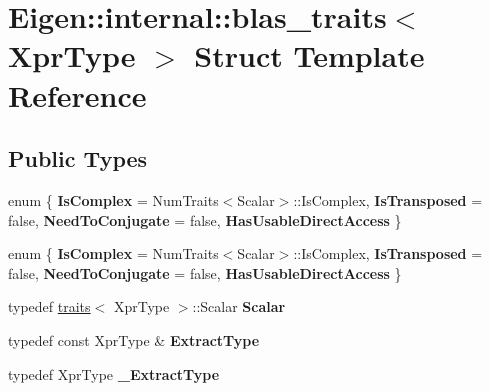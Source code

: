 \hypertarget{struct_eigen_1_1internal_1_1blas__traits}{}\section{Eigen\+:\+:internal\+:\+:blas\+\_\+traits$<$ Xpr\+Type $>$ Struct Template Reference}
\label{struct_eigen_1_1internal_1_1blas__traits}
\subsection*{Public Types}
\begin{DoxyCompactItemize}
\item 
\mbox{\label{struct_eigen_1_1internal_1_1blas__traits_aa182e1521086cb597f3a8b97972f165c}} 
enum \{ {\bfseries Is\+Complex} = Num\+Traits$<$Scalar$>$\+:\+:Is\+Complex, 
{\bfseries Is\+Transposed} = false, 
{\bfseries Need\+To\+Conjugate} = false, 
{\bfseries Has\+Usable\+Direct\+Access}
 \}
\item 
\mbox{\label{struct_eigen_1_1internal_1_1blas__traits_aeee0d46b5f37957c002753e973af4cbe}} 
enum \{ {\bfseries Is\+Complex} = Num\+Traits$<$Scalar$>$\+:\+:Is\+Complex, 
{\bfseries Is\+Transposed} = false, 
{\bfseries Need\+To\+Conjugate} = false, 
{\bfseries Has\+Usable\+Direct\+Access}
 \}
\item 
\mbox{\label{struct_eigen_1_1internal_1_1blas__traits_ac5b1b5ec7dfe61418c561674e47a5cdd}} 
typedef \hyperlink{struct_eigen_1_1internal_1_1traits}{traits}$<$ Xpr\+Type $>$\+::Scalar {\bfseries Scalar}
\item 
\mbox{\label{struct_eigen_1_1internal_1_1blas__traits_a63b33a3d263ccd7709cb758a560ab5b6}} 
typedef const Xpr\+Type \& {\bfseries Extract\+Type}
\item 
\mbox{\label{struct_eigen_1_1internal_1_1blas__traits_ada873c310e824caadb8bd690cac37316}} 
typedef Xpr\+Type {\bfseries \+\_\+\+Extract\+Type}
\item 
\mbox{\label{struct_eigen_1_1internal_1_1blas__traits_a6c3057fb89fc7a4257c3b06e9931438f}} 

\end{DoxyCompactItemize}
